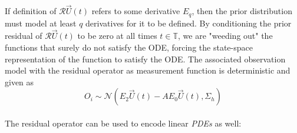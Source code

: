 If definition of $\mathcal{R}\vec{U}(t)$ refers to some derivative $E_q$, then the prior distribution must model at least $q$ derivatives for it to be defined. By conditioning the prior residual of $\mathcal{R}\vec{U}(t)$ to be zero at all times $t \in \mathbb{T}$, we are "weeding out" the functions that surely do not satisfy the ODE, forcing the state-space representation of the function to satisfy the ODE. The associated observation model with the residual operator as measurement function is deterministic and given as $$O_i \sim \mathcal{N}(E_2\vec{U}(t) - AE_0\vec{U}(t), \Sigma_h)$$
\\
The residual operator can be used to encode linear \textit{PDEs} as well:
